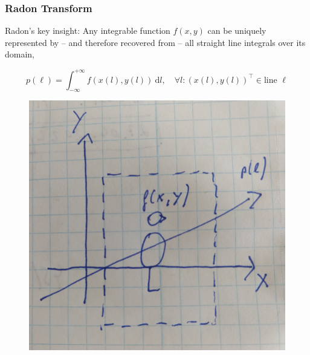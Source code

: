  
\begin{frame}
	\frametitle{Radon Transform}

	Radon's key insight: Any integrable function $f(x,y)$ can be uniquely represented by -- and therefore recovered from -- all straight line integrals over its domain,

	\begin{equation}
		\label{eqn:ct_radon_1}
		p(\ell) = \int_{-\infty}^{+\infty} f\left(x\left(l\right), y\left(l\right)\right) \ \text{d}l, \quad \forall l: \left(x\left(l\right), y\left(l\right)\right)^\top \in \text{line } \ell
	\end{equation}
		
	\begin{figure}[tbp]
		\centering
		\includegraphics[height=0.4\textheight]{images/radon1_sketch}%
		\label{fig:ct_radon1_sketch}
	\end{figure}
	
\end{frame}



